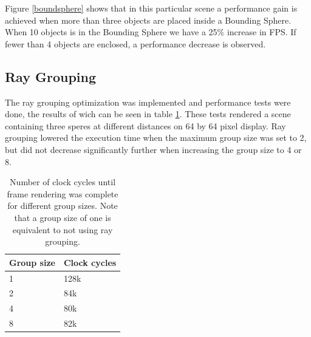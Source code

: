 			Figure \ref{boundsphere} shows that in this particular scene a
			performance gain is achieved when more than three objects are
			placed inside a Bounding Sphere.  When 10 objects is in the
			Bounding Sphere we have a 25\% increase in FPS.  If fewer than 4
			objects are enclosed, a performance decrease is observed. 
		
		\subsection{Ray Grouping}
			
			The ray grouping optimization was implemented and performance tests
			were done, the results of wich can be seen in table
			\ref{grouptable}. These tests rendered a scene containing three
			speres at different distances on 64 by 64 pixel display. Ray
			grouping lowered the execution time when the maximum group size was
			set to 2, but did not decrease significantly further when
			increasing the group size to 4 or 8.  

			\begin{table}[h]
			\centering
			\begin{tabular}{ll}
				\hline
				Group size & Clock cycles\\
				\hline
				1          & 128k        \\
				2          & 84k         \\
				4          & 80k         \\
				8          & 82k         \\
				\hline
			\end{tabular}
			\caption{Number of clock cycles until frame rendering was complete
				for different group sizes. Note that a group size of one is 
				equivalent to not using ray grouping.}
			\label{grouptable}
			\end{table}
